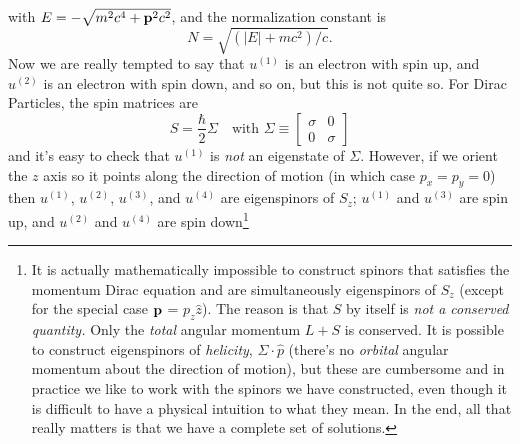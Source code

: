 with $E = -\sqrt{m^2c^4 + \bold{p}^2c^2}$, and the normalization constant is
\begin{equation}
N = \sqrt{(|E|+mc^2)/c}.
\end{equation}
Now we are really tempted to say that $u^{(1)}$ is an electron with spin up,
and $u^{(2)}$ is an electron with spin down, and so on, but this is not quite so.
For Dirac Particles, the spin matrices are
\begin{equation}
S = \frac{\hbar}{2}\Sigma\quad\mbox{with }\Sigma\equiv\begin{bmatrix}\sigma & 0\\0 & \sigma\end{bmatrix}
\end{equation}
and it's easy to check that $u^{(1)}$ is \emph{not} an eigenstate of $\Sigma$.
However, if we orient the $z$ axis so it points along the direction of motion
(in which case $p_x = p_y = 0$) then $u^{(1)}$, $u^{(2)}$, $u^{(3)}$, and $u^{(4)}$
are eigenspinors of $S_z$; $u^{(1)}$ and $u^{(3)}$ are spin up, and
$u^{(2)}$ and $u^{(4)}$ are spin down\footnote{It is actually mathematically
impossible to construct spinors that satisfies the momentum Dirac equation and
are simultaneously eigenspinors of $S_z$ (except for the special case $\bold{p}$ = $p_z\hat{z}$).
The reason is that $S$ by itself is \emph{not a conserved quantity.} Only the
\emph{total} angular momentum $L+S$ is conserved. It is possible to construct
eigenspinors of \emph{helicity}, $\Sigma\cdot\hat{p}$ (there's no \emph{orbital}
angular momentum about the direction of motion), but these are cumbersome and in
practice we like to work with the spinors we have constructed, even though it is
difficult to have a physical intuition to what they mean. In the end, all that
really matters is that we have a complete set of solutions.}

